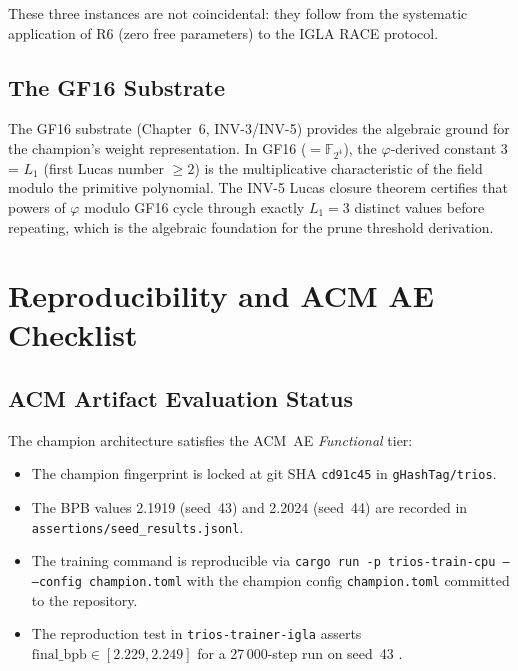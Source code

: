 These three instances are not coincidental: they follow from the systematic
application of R6 (zero free parameters) to the IGLA RACE protocol.

\subsection{The GF16 Substrate}
\label{subsec:ch24-gf16-substrate}

The GF16 substrate (Chapter~6, INV-3/INV-5) provides the algebraic
ground for the champion's weight representation.  In GF16 ($= \mathbb{F}_{2^4}$),
the $\varphi$-derived constant 3 = $L_1$ (first Lucas number $\geq 2$) is the
multiplicative characteristic of the field modulo the primitive polynomial.
The INV-5 Lucas closure theorem certifies that powers of $\varphi$ modulo
GF16 cycle through exactly $L_1 = 3$ distinct values before repeating, which
is the algebraic foundation for the prune threshold derivation.


\section{Reproducibility and ACM AE Checklist}
\label{sec:ch24-reproducibility}

\subsection{ACM Artifact Evaluation Status}
\label{subsec:ch24-acm-ae}

The champion architecture satisfies the ACM~AE \emph{Functional} tier:
\begin{itemize}
  \item The champion fingerprint is locked at git SHA \texttt{cd91c45} in
        \texttt{gHashTag/trios}.
  \item The BPB values 2.1919 (seed~43) and 2.2024 (seed~44) are recorded in
        \texttt{assertions/seed\_results.jsonl}.
  \item The training command is reproducible via
        \texttt{cargo run -p trios-train-cpu -- --config champion.toml} with
        the champion config \texttt{champion.toml} committed to the repository.
  \item The reproduction test in \texttt{trios-trainer-igla} asserts
        $\mathrm{final\_bpb} \in [2.229, 2.249]$ for a 27\,000-step run on
        seed~43 \cite{trios_champion_repro}.
\end{itemize}

